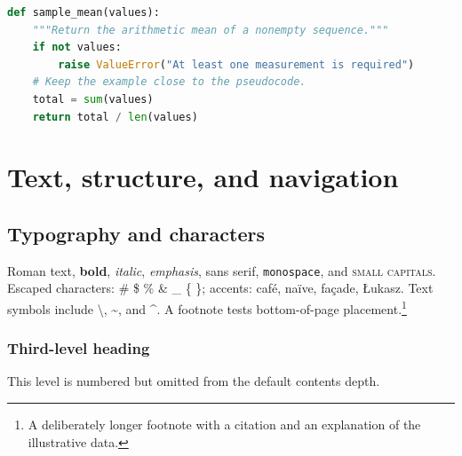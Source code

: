 \documentclass[algorithms,listings]{tempusreport}
\begin{document}
\begin{lstlisting}[language=Python,caption={A minimal sample mean implementation.},label={lst:mean}]
def sample_mean(values):
    """Return the arithmetic mean of a nonempty sequence."""
    if not values:
        raise ValueError("At least one measurement is required")
    # Keep the example close to the pseudocode.
    total = sum(values)
    return total / len(values)
\end{lstlisting}


\section{Text, structure, and navigation}
\label{sec:text}
\subsection{Typography and characters}
Roman text, \textbf{bold}, \textit{italic}, \emph{emphasis},
\textsf{sans serif}, \texttt{monospace}, and \textsc{small capitals}.
Escaped characters: \# \$ \% \& \_ \{ \}; accents: caf\'e,
na\"ive, fa\c{c}ade, \L ukasz. Text symbols include \textbackslash,
\textasciitilde, and \textasciicircum. A footnote tests bottom-of-page
placement.\footnote{A deliberately longer footnote with a citation
\citep{vaswani2017attention} and an explanation of the illustrative data.}
\subsubsection{Third-level heading}
This level is numbered but omitted from the default contents depth.
\end{document}
